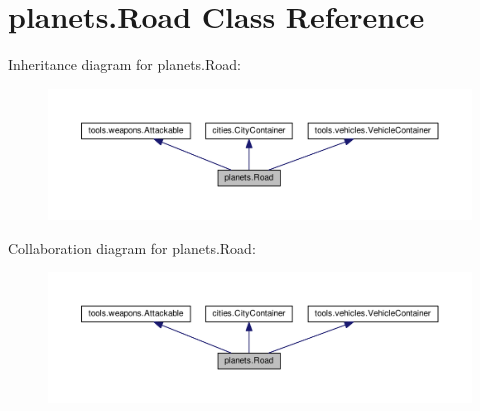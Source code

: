 \hypertarget{classplanets_1_1_road}{}\section{planets.\+Road Class Reference}
\label{classplanets_1_1_road}


Inheritance diagram for planets.\+Road\+:\nopagebreak
\begin{figure}[H]
\begin{center}
\leavevmode
\includegraphics[width=350pt]{classplanets_1_1_road__inherit__graph}
\end{center}
\end{figure}


Collaboration diagram for planets.\+Road\+:\nopagebreak
\begin{figure}[H]
\begin{center}
\leavevmode
\includegraphics[width=350pt]{classplanets_1_1_road__coll__graph}
\end{center}
\end{figure}
